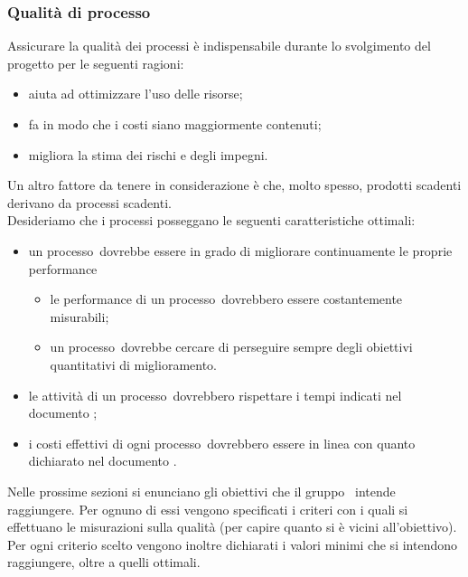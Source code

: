 \documentclass[../PianoDiQualifica.tex]{subfiles}
\begin{document}
		\subsubsection{Qualità di processo}
		Assicurare la qualità dei processi è indispensabile durante lo svolgimento del progetto per le seguenti ragioni:
		\begin{itemize}
		\item aiuta ad ottimizzare l'uso delle risorse;
		\item fa in modo che i costi siano maggiormente contenuti;
		\item migliora la stima dei rischi e degli impegni.
		\end{itemize}
		Un altro fattore da tenere in considerazione è che, molto spesso, prodotti scadenti derivano da processi scadenti.\\
		Desideriamo che i processi posseggano le seguenti caratteristiche ottimali:
		\begin{itemize}
			\item un processo\g\ dovrebbe essere in grado di migliorare continuamente le proprie performance
			\begin{itemize}
				\item le performance di un processo\g\ dovrebbero essere costantemente misurabili;
				\item un processo\g\ dovrebbe cercare di perseguire sempre degli obiettivi quantitativi di miglioramento.
			\end{itemize}
			\item le attività di un processo\g\ dovrebbero rispettare i tempi indicati nel documento \pianodiprogettov;
			\item i costi effettivi di ogni processo\g\ dovrebbero essere in linea con quanto dichiarato nel documento \pianodiprogettov.
		\end{itemize}
		Nelle prossime sezioni si enunciano gli obiettivi che il gruppo \leaf\ intende raggiungere. Per ognuno di essi vengono specificati i criteri con i quali si effettuano le misurazioni sulla qualità (per capire quanto si è vicini all’obiettivo).\\
		Per ogni criterio scelto vengono inoltre dichiarati i valori minimi che si intendono raggiungere, oltre a quelli ottimali.
			
\end{document}

